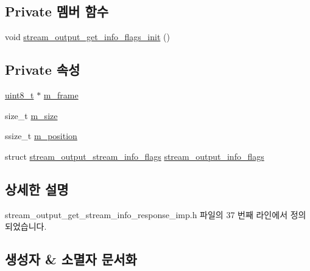 \subsection*{Private 멤버 함수}
\begin{DoxyCompactItemize}
\item 
void \hyperlink{classavdecc__lib_1_1stream__output__get__stream__info__response__imp_a838b71cbdb158e9863de39f19558edb2}{stream\+\_\+output\+\_\+get\+\_\+info\+\_\+flags\+\_\+init} ()
\end{DoxyCompactItemize}
\subsection*{Private 속성}
\begin{DoxyCompactItemize}
\item 
\hyperlink{stdint_8h_aba7bc1797add20fe3efdf37ced1182c5}{uint8\+\_\+t} $\ast$ \hyperlink{classavdecc__lib_1_1stream__output__get__stream__info__response__imp_a50417969cf438e7c8d698726bbbe2ff9}{m\+\_\+frame}
\item 
size\+\_\+t \hyperlink{classavdecc__lib_1_1stream__output__get__stream__info__response__imp_a0dc3c363255f193681c77b4d2a82e995}{m\+\_\+size}
\item 
ssize\+\_\+t \hyperlink{classavdecc__lib_1_1stream__output__get__stream__info__response__imp_af5e691c4a8a0feb07f48440b321206cd}{m\+\_\+position}
\item 
struct \hyperlink{structavdecc__lib_1_1stream__output__get__stream__info__response__imp_1_1stream__output__stream__info__flags}{stream\+\_\+output\+\_\+stream\+\_\+info\+\_\+flags} \hyperlink{classavdecc__lib_1_1stream__output__get__stream__info__response__imp_a6d7551cfde27cb9e779880d7f18f50ff}{stream\+\_\+output\+\_\+info\+\_\+flags}
\end{DoxyCompactItemize}


\subsection{상세한 설명}


stream\+\_\+output\+\_\+get\+\_\+stream\+\_\+info\+\_\+response\+\_\+imp.\+h 파일의 37 번째 라인에서 정의되었습니다.



\subsection{생성자 \& 소멸자 문서화}
